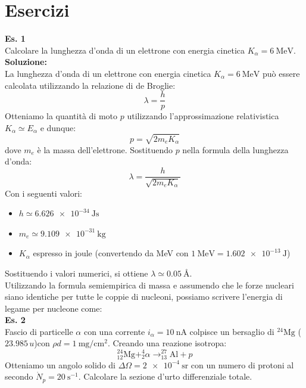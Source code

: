 \chapter{Esercizi}
\textbf{Es. 1}\\
Calcolare la lunghezza d'onda di un elettrone con energia cinetica $K_\alpha = \qty{6}{\mega\electronvolt}$.\\
\textbf{Soluzione:}\\
La lunghezza d'onda di un elettrone con energia cinetica $K_\alpha = \qty{6}{\mega\electronvolt}$ può essere calcolata utilizzando la relazione di de Broglie:
\begin{equation}
\lambda = \frac{h}{p}
\end{equation}
Otteniamo la quantità di moto $p$ utilizzando l'approssimazione relativistica $K_\alpha \simeq E_\alpha$ e dunque:
\begin{equation}
p = \sqrt{2m_e K_\alpha}
\end{equation}
dove $m_e$ è la massa dell'elettrone. Sostituendo $p$ nella formula della lunghezza d'onda:
\begin{equation}
\lambda = \frac{h}{\sqrt{2m_e K_\alpha}}
\end{equation}
Con i seguenti valori:
\begin{itemize}
 \item $h \simeq \qty{6.626e-34}{\joule\second}$
 \item $m_e \simeq \qty{9.109e-31}{\kilo\gram}$
 \item $K_\alpha$ espresso in joule (convertendo da MeV con $\qty{1}{\mega\electronvolt} = \qty{1.602e-13}{\joule}$)
\end{itemize}
Sostituendo i valori numerici, si ottiene $\lambda \simeq \qty{0.05}{\angstrom}$.\\
Utilizzando la formula semiempirica di massa e assumendo che le forze nucleari siano identiche per tutte le coppie di
nucleoni, possiamo scrivere l'energia di legame per nucleone come:\\
\textbf{Es. 2}\\
Fascio di particelle $\alpha$ con una corrente $i_\alpha = \qty{10}{\nano\ampere}$ colpisce un bersaglio di $^{24}\text{Mg}$ ($23.985 \,u$)con $\rho d = \qty{1}{\milli\gram\per\centi\meter^2}$. Creando una reazione isotropa:
\begin{equation}
^{24}_{12}\text{Mg} + ^4_2\alpha \rightarrow ^{27}_{13}\text{Al} + p
\end{equation}
Otteniamo un angolo solido di $\Delta \Omega = \qty{2e-4}{\steradian}$ con un numero di protoni al secondo $\dot{N}_p = \qty{20}{\second^{-1}}$. Calcolare la sezione d'urto differenziale totale.\\
